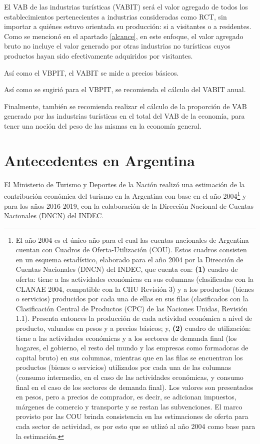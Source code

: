 \documentclass[
  openany]{book}
\begin{document}
El VAB de las industrias turísticas (VABIT) será el valor agregado de todos los establecimientos pertenecientes a industrias consideradas como RCT, sin importar a quiénes estuvo orientada su producción: si a visitantes o a residentes. Como se mencionó en el apartado \ref{alcance}, en este enfoque, el valor agregado bruto no incluye el valor generado por otras industrias no turísticas cuyos productos hayan sido efectivamente adquiridos por visitantes.

Así como el VBPIT, el VABIT se mide a precios básicos.

Así como se sugirió para el VBPIT, se recomienda el cálculo del VABIT anual.

Finalmente, también se recomienda realizar el cálculo de la proporción de VAB generado por las industrias turísticas en el total del VAB de la economía, para tener una noción del peso de las mismas en la economía general.

\hypertarget{antecedentes-en-argentina}{%
\section{Antecedentes en Argentina}\label{antecedentes-en-argentina}}

El Ministerio de Turismo y Deportes de la Nación realizó una estimación de la contribución económica del turismo en la Argentina con base en el año 2004\footnote{El año 2004 es el único año para el cual las cuentas nacionales de Argentina cuentan con Cuadros de Oferta-Utilización (COU). Estos cuadros consisten en un esquema estadístico, elaborado para el año 2004 por la Dirección de Cuentas Nacionales (DNCN) del INDEC, que cuenta con: \textbf{(1)} cuadro de oferta: tiene a las actividades económicas en sus columnas (clasificadas con la CLANAE 2004, compatible con la CIIU Revisión 3) y a los productos (bienes o servicios) producidos por cada una de ellas en sus filas (clasificados con la Clasificación Central de Productos (CPC) de las Naciones Unidas, Revisión 1.1). Presenta entonces la producción de cada actividad económica a nivel de producto, valuados en pesos y a precios básicos; y, \textbf{(2)} cuadro de utilización: tiene a las actividades económicas y a los sectores de demanda final (los hogares, el gobierno, el resto del mundo y las empresas como formadoras de capital bruto) en sus columnas, mientras que en las filas se encuentran los productos (bienes o servicios) utilizados por cada una de las columnas (consumo intermedio, en el caso de las actividades económicas, y consumo final en el caso de los sectores de demanda final). Los valores son presentados en pesos, pero a precios de comprador, es decir, se adicionan impuestos, márgenes de comercio y transporte y se restan las subvenciones. El marco provisto por las COU brinda consistencia en las estimaciones de oferta para cada sector de actividad, es por esto que se utlizó al año 2004 como base para la estimación.} y para los años 2016-2019, con la colaboración de la Dirección Nacional de Cuentas Nacionales (DNCN) del INDEC.
\end{document}
